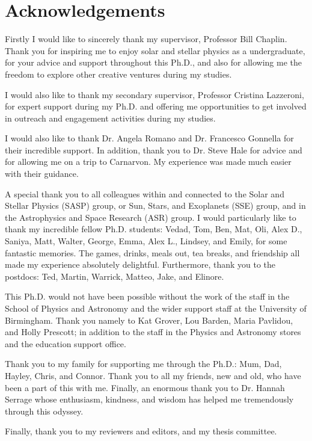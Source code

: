 \chapter*{Acknowledgements}
\thispagestyle{plain}

Firstly I would like to sincerely thank my supervisor, Professor Bill Chaplin. Thank you for inspiring me to enjoy solar and stellar physics as a undergraduate, for your advice and support throughout this Ph.D., and also for allowing me the freedom to explore other creative ventures during my studies.

I would also like to thank my secondary supervisor, Professor Cristina Lazzeroni, for expert support during my Ph.D. and offering me opportunities to get involved in outreach and engagement activities during my studies.

I would also like to thank Dr. Angela Romano and Dr. Francesco Gonnella for their incredible support. In addition, thank you to Dr. Steve Hale for advice and for allowing me on a trip to Carnarvon. My experience was made much easier with their guidance.

A special thank you to all colleagues within and connected to the Solar and Stellar Physics (SASP) group, or Sun, Stars, and Exoplanets (SSE) group, and in the Astrophysics and Space Research (ASR) group. I would particularly like to thank my incredible fellow Ph.D. students: Vedad, Tom, Ben, Mat, Oli, Alex D., Saniya, Matt, Walter, George, Emma, Alex L., Lindsey, and Emily, for some fantastic memories. The games, drinks, meals out, tea breaks, and friendship all made my experience absolutely delightful. Furthermore, thank you to the postdocs: Ted, Martin, Warrick, Matteo, Jake, and Elinore.

This Ph.D. would not have been possible without the work of the staff in the School of Physics and Astronomy and the wider support staff at the University of Birmingham. Thank you namely to Kat Grover, Lou Barden, Maria Pavlidou, and Holly Prescott; in addition to the staff in the Physics and Astronomy stores and the education support office.

Thank you to my family for supporting me through the Ph.D.: Mum, Dad, Hayley, Chris, and Connor. Thank you to all my friends, new and old, who have been a part of this with me. Finally, an enormous thank you to Dr. Hannah Serrage whose enthusiasm, kindness, and wisdom has helped me tremendously through this odyssey.

Finally, thank you to my reviewers and editors, and my thesis committee.